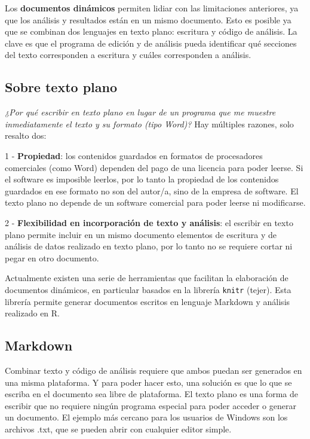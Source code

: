 \documentclass[11pt,]{book}
\begin{document}
Los \textbf{documentos dinámicos} permiten lidiar con las limitaciones anteriores, ya que los análisis y resultados están en un mismo documento. Esto es posible ya que se combinan dos lenguajes en texto plano: escritura y código de análisis. La clave es que el programa de edición y de análisis pueda identificar qué secciones del texto corresponden a escritura y cuáles corresponden a análisis.

\hypertarget{sobre-texto-plano}{%
\subsection{Sobre texto plano}\label{sobre-texto-plano}}

\emph{¿Por qué escribir en texto plano en lugar de un programa que me muestre inmediatamente el texto y su formato (tipo Word)?}
Hay múltiples razones, solo resalto dos:

1 - \textbf{Propiedad}: los contenidos guardados en formatos de procesadores comerciales (como Word) dependen del pago de una licencia para poder leerse. Si el software es imposible leerlos, por lo tanto la propiedad de los contenidos guardados en ese formato no son del autor/a, sino de la empresa de software. El texto plano no depende de un software comercial para poder leerse ni modificarse.

2 - \textbf{Flexibilidad en incorporación de texto y análisis}: el escribir en texto plano permite incluir en un mismo documento elementos de escritura y de análisis de datos realizado en texto plano, por lo tanto no se requiere cortar ni pegar en otro documento.

Actualmente existen una serie de herramientas que facilitan la elaboración de documentos dinámicos, en particular basados en la librería \texttt{knitr} (tejer). Esta librería permite generar documentos escritos en lenguaje Markdown y análisis realizado en R.

\hypertarget{markdown}{%
\subsection{Markdown}\label{markdown}}

Combinar texto y código de análisis requiere que ambos puedan ser generados en una misma plataforma. Y para poder hacer esto, una solución es que lo que se escriba en el documento sea libre de plataforma. El texto plano es una forma de escribir que no requiere ningún programa especial para poder acceder o generar un documento. El ejemplo más cercano para los usuarios de Windows son los archivos .txt, que se pueden abrir con cualquier editor simple.
\end{document}
